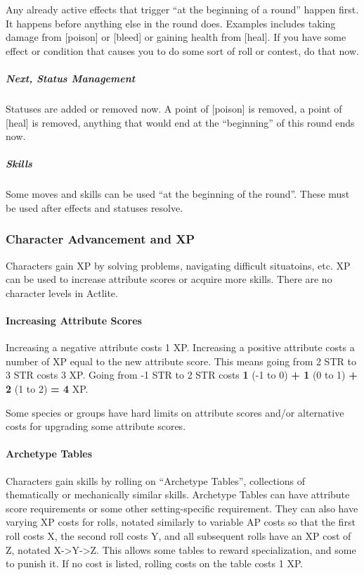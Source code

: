 \documentclass[
  letterpaper,
  DIV=11,
  numbers=noendperiod]{scrartcl}
\let\oldparagraph\paragraph
\renewcommand{\paragraph}[1]{\oldparagraph{#1}\mbox{}}
\let\oldsubparagraph\subparagraph
\renewcommand{\subparagraph}[1]{\oldsubparagraph{#1}\mbox{}}
\begin{document}
Any already active effects that trigger ``at the beginning of a round''
happen first. It happens before anything else in the round does.
Examples includes taking damage from {[}poison{]} or {[}bleed{]} or
gaining health from {[}heal{]}. If you have some effect or condition
that causes you to do some sort of roll or contest, do that now.

\subparagraph{Next, Status Management}\label{next-status-management}

Statuses are added or removed now. A point of {[}poison{]} is removed, a
point of {[}heal{]} is removed, anything that would end at the
``beginning'' of this round ends now.

\subparagraph{Skills}\label{skills}

Some moves and skills can be used ``at the beginning of the round''.
These must be used after effects and statuses resolve.

\subsubsection{Character Advancement and
XP}\label{character-advancement-and-xp}

Characters gain XP by solving problems, navigating difficult situatoins,
etc. XP can be used to increase attribute scores or acquire more skills.
There are no character levels in Actlite.

\paragraph{Increasing Attribute
Scores}\label{increasing-attribute-scores}

Increasing a negative attribute costs 1 XP. Increasing a positive
attribute costs a number of XP equal to the new attribute score. This
means going from 2 STR to 3 STR costs 3 XP. Going from -1 STR to 2 STR
costs \textbf{1} (-1 to 0) \textbf{+ 1} (0 to 1) \textbf{+ 2} (1 to 2)
\textbf{= 4} XP.

Some species or groups have hard limits on attribute scores and/or
alternative costs for upgrading some attribute scores.

\paragraph{Archetype Tables}\label{archetype-tables}

Characters gain skills by rolling on ``Archetype Tables'', collections
of thematically or mechanically similar skills. Archetype Tables can
have attribute score requirements or some other setting-specific
requirement. They can also have varying XP costs for rolls, notated
similarly to variable AP costs so that the first roll costs X, the
second roll costs Y, and all subsequent rolls have an XP cost of Z,
notated X-\textgreater Y-\textgreater Z. This allows some tables to
reward specialization, and some to punish it. If no cost is listed,
rolling costs on the table costs 1 XP.
\end{document}
